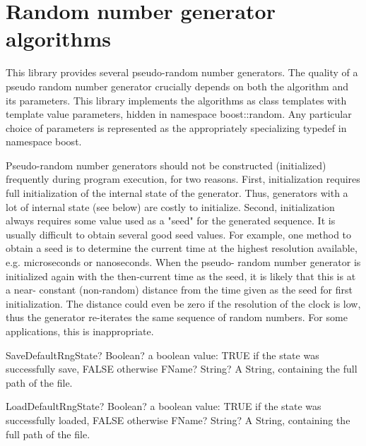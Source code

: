 \section{Random number generator algorithms}
\label{RandomNumberAlgorithms}

\vspace{0.3cm}
This library provides several pseudo-random number generators. The quality of a pseudo random number generator 
crucially depends on both the algorithm and its parameters. This library implements the algorithms as class templates with 
template value parameters, hidden in namespace boost::random. Any particular choice of parameters is represented 
as the appropriately specializing typedef in namespace boost.  

Pseudo-random number generators should not be constructed (initialized) frequently during program execution, for two 
reasons. First, initialization requires full initialization of the internal state of the generator. Thus, generators with a lot of 
internal state (see below) are costly to initialize. Second, initialization always requires some value used as a "seed" for the 
generated sequence. It is usually difficult to obtain several good seed values. For example, one method to obtain a seed is 
to determine the current time at the highest resolution available, e.g. microseconds or nanoseconds. When the pseudo-
random number generator is initialized again with the then-current time as the seed, it is likely that this is at a near-
constant (non-random) distance from the time given as the seed for first initialization. The distance could even be zero if 
the resolution of the clock is low, thus the generator re-iterates the same sequence of random numbers. For some 
applications, this is inappropriate.  

\vspace{0.3cm}
\begin{mpFunctionsExtract}
	\mpFunctionOne
	{SaveDefaultRngState? Boolean? a boolean value: TRUE if the state was successfully save, FALSE otherwise}
	{FName? String? A String, containing the full path of the file.}
\end{mpFunctionsExtract}

\vspace{0.6cm}
\begin{mpFunctionsExtract}
	\mpFunctionOne
	{LoadDefaultRngState? Boolean? a boolean value: TRUE if the state was successfully loaded, FALSE otherwise}
	{FName? String? A String, containing the full path of the file.}
\end{mpFunctionsExtract}

